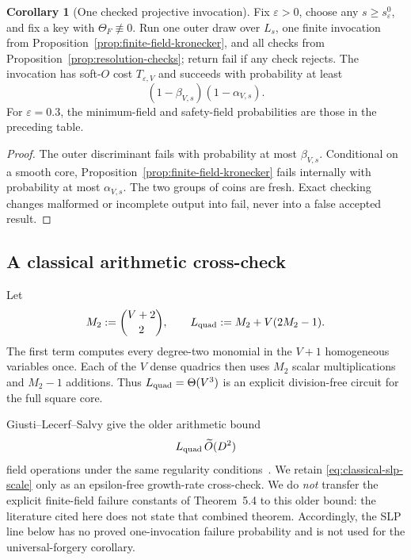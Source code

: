 \documentclass[11pt,a4paper]{article}
\theoremstyle{definition}
\newtheorem{corollary}[theorem]{Corollary}
\theoremstyle{remark}
\begin{document}
\begin{corollary}[One checked projective invocation]\label{cor:fast-single-invocation}
Fix $\varepsilon>0$, choose any $s\ge s_\varepsilon^0$, and fix a key with $\Theta_F\not\equiv0$.  Run one outer draw over $L_s$, one finite invocation from Proposition~\ref{prop:finite-field-kronecker}, and all checks from Proposition~\ref{prop:resolution-checks}; return \textsf{fail} if any check rejects.  The invocation has soft-$O$ cost $T_{\varepsilon,V}$ and succeeds with probability at least
\begin{equation}\label{eq:fast-single-invocation-success}
 (1-\beta_{V,s})(1-\alpha_{V,s}).
\end{equation}
For $\varepsilon=0.3$, the minimum-field and safety-field probabilities are those in the preceding table.
\end{corollary}

\begin{proof}
The outer discriminant fails with probability at most $\beta_{V,s}$.  Conditional on a smooth core, Proposition~\ref{prop:finite-field-kronecker} fails internally with probability at most $\alpha_{V,s}$.  The two groups of coins are fresh.  Exact checking changes malformed or incomplete output into \textsf{fail}, never into a false accepted result.
\end{proof}

\subsection{A classical arithmetic cross-check}\label{subsec:slp-solver}

Let
\begin{equation}\label{eq:slp-length}
 M_2:=\binom{V+2}{2},
 \qquad
 L_{\rm quad}:=M_2+V(2M_2-1).
\end{equation}
The first term computes every degree-two monomial in the $V+1$ homogeneous variables once.  Each of the $V$ dense quadrics then uses $M_2$ scalar multiplications and $M_2-1$ additions.  Thus $L_{\rm quad}=\Theta(V^3)$ is an explicit division-free circuit for the full square core.

Giusti--Lecerf--Salvy give the older arithmetic bound
\begin{equation}\label{eq:classical-slp-scale}
 L_{\rm quad}\,\widetilde O(D^2)
\end{equation}
field operations under the same regularity conditions~\cite{vdHL,GiustiLecerfSalvy2001}.  We retain \eqref{eq:classical-slp-scale} only as an epsilon-free growth-rate cross-check.  We do \emph{not} transfer the explicit finite-field failure constants of Theorem~5.4 to this older bound: the literature cited here does not state that combined theorem.  Accordingly, the SLP line below has no proved one-invocation failure probability and is not used for the universal-forgery corollary.
\end{document}
